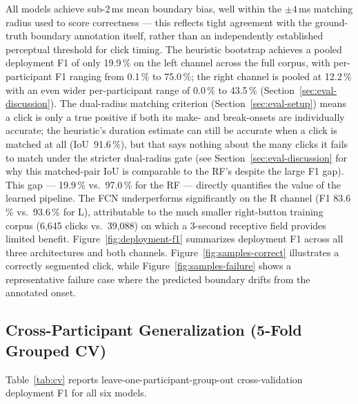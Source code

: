 All models achieve sub-2\,ms mean boundary bias, well within the $\pm4$\,ms
matching radius used to score correctness --- this reflects tight agreement
with the ground-truth boundary annotation itself, rather than an
independently established perceptual threshold for click timing.
The heuristic bootstrap achieves
a pooled deployment F1 of only 19.9\,\% on the left channel across the full corpus,
with per-participant F1 ranging from 0.1\,\% to 75.0\,\%; the right channel
is pooled at 12.2\,\% with an even wider per-participant range of 0.0\,\% to 43.5\,\%
(Section~\ref{sec:eval-discussion}).
The dual-radius matching criterion (Section~\ref{sec:eval-setup}) means a click is
only a true positive if both its make- and break-onsets are individually accurate;
the heuristic's duration estimate can still be accurate when a click is matched at
all (IoU~91.6\,\%), but that says nothing about the many clicks it fails to match
under the stricter dual-radius gate (see Section~\ref{sec:eval-discussion} for why
this matched-pair IoU is comparable to the RF's despite the large F1 gap).  This gap
--- 19.9\,\% vs.\ 97.0\,\% for the RF --- directly quantifies the value of the
learned pipeline.
The FCN underperforms significantly
on the R channel (F1 83.6\,\% vs.\ 93.6\,\% for L), attributable to the much smaller
right-button training corpus (6,645 clicks vs.\ 39,088) on which a 3-second receptive
field provides limited benefit. Figure~\ref{fig:deployment-f1} summarizes deployment
F1 across all three architectures and both channels. Figure~\ref{fig:samples-correct}
illustrates a correctly segmented click, while Figure~\ref{fig:samples-failure}
shows a representative failure case where the predicted boundary drifts from the
annotated onset.





\subsection{Cross-Participant Generalization (5-Fold Grouped CV)}
Table~\ref{tab:cv} reports leave-one-participant-group-out cross-validation deployment
F1 for all six models.

